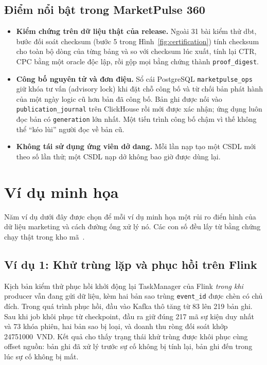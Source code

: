 \subsection{Điểm nổi bật trong MarketPulse 360}
\label{sec:c3-dagster-hien-thuc}
\begin{itemize}
    \item \textbf{Kiểm chứng trên dữ liệu thật của release.} Ngoài 31 bài kiểm thử dbt, bước đối soát checksum (bước 5 trong Hình~\ref{fig:certification}) tính checksum cho toàn bộ dòng của từng bảng và so với checksum lúc xuất, tính lại CTR, CPC bằng một oracle độc lập, rồi gộp mọi bằng chứng thành \texttt{proof\_digest}.
    \item \textbf{Công bố nguyên tử và đơn điệu.} Sổ cái PostgreSQL \texttt{marketpulse\_ops} giữ khóa tư vấn (advisory lock) khi đặt chỗ công bố và từ chối bản phát hành của một ngày logic cũ hơn bản đã công bố. Bản ghi được nối vào \texttt{publication\_journal} trên ClickHouse rồi mới được xác nhận; ứng dụng luôn đọc bản có \texttt{generation} lớn nhất. Một tiến trình công bố chậm vì thế không thể ``kéo lùi'' người đọc về bản cũ.
    \item \textbf{Không tái sử dụng ứng viên dở dang.} Mỗi lần nạp tạo một CSDL mới theo số lần thử; một CSDL nạp dở không bao giờ được dùng lại.
\end{itemize}

\section{Ví dụ minh họa}
\label{sec:c3-vi-du}

Năm ví dụ dưới đây được chọn để mỗi ví dụ minh họa một rủi ro điển hình của dữ liệu marketing và cách đường ống xử lý nó. Các con số đều lấy từ bằng chứng chạy thật trong kho mã~\cite{mp360repo}.

\subsection{Ví dụ 1: Khử trùng lặp và phục hồi trên Flink}
\label{sec:c3-vi-du-1}
Kịch bản kiểm thử phục hồi khởi động lại TaskManager của Flink \emph{trong khi} producer vẫn đang gửi dữ liệu, kèm hai bản sao trùng \texttt{event\_id} được chèn có chủ đích. Trong quá trình phục hồi, đầu vào Kafka thô tăng từ 83 lên 219 bản ghi. Sau khi job khôi phục từ checkpoint, đầu ra giữ đúng 217 mã sự kiện duy nhất và 73 khóa phiên, hai bản sao bị loại, và doanh thu ròng đối soát khớp \num{24751000}~VND. Kết quả cho thấy trạng thái khử trùng được khôi phục cùng offset nguồn: bản ghi đã xử lý trước sự cố không bị tính lại, bản ghi đến trong lúc sự cố không bị mất.


